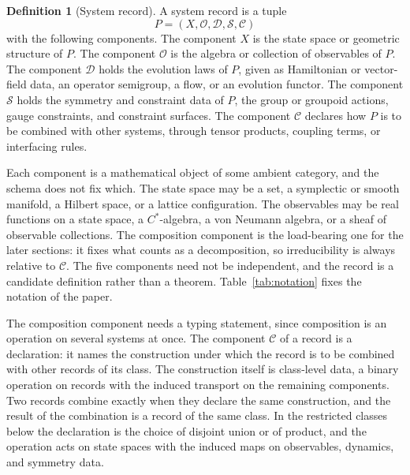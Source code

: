\documentclass[11pt,letterpaper]{article}
\theoremstyle{definition}
\newtheorem{definition}[theorem]{Definition}
\theoremstyle{remark}
\begin{document}
\begin{definition}[System record]
\label{def:record}
A system record is a tuple
\[
P = (X, \mathcal{O}, \mathcal{D}, \mathcal{S}, \mathcal{C})
\]
with the following components. The component $X$ is the state space or geometric structure of $P$. The component $\mathcal{O}$ is the algebra or collection of observables of $P$. The component $\mathcal{D}$ holds the evolution laws of $P$, given as Hamiltonian or vector-field data, an operator semigroup, a flow, or an evolution functor. The component $\mathcal{S}$ holds the symmetry and constraint data of $P$, the group or groupoid actions, gauge constraints, and constraint surfaces. The component $\mathcal{C}$ declares how $P$ is to be combined with other systems, through tensor products, coupling terms, or interfacing rules.
\end{definition}

Each component is a mathematical object of some ambient category, and the schema does not fix which. The state space may be a set, a symplectic or smooth manifold, a Hilbert space, or a lattice configuration. The observables may be real functions on a state space, a $C^*$-algebra, a von Neumann algebra, or a sheaf of observable collections. The composition component is the load-bearing one for the later sections: it fixes what counts as a decomposition, so irreducibility is always relative to $\mathcal{C}$. The five components need not be independent, and the record is a candidate definition rather than a theorem. Table~\ref{tab:notation} fixes the notation of the paper.

The composition component needs a typing statement, since composition is an operation on several systems at once. The component $\mathcal{C}$ of a record is a declaration: it names the construction under which the record is to be combined with other records of its class. The construction itself is class-level data, a binary operation on records with the induced transport on the remaining components. Two records combine exactly when they declare the same construction, and the result of the combination is a record of the same class. In the restricted classes below the declaration is the choice of disjoint union or of product, and the operation acts on state spaces with the induced maps on observables, dynamics, and symmetry data.
\end{document}
